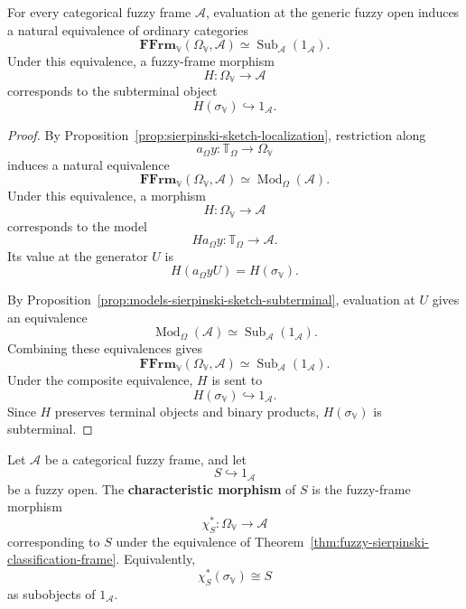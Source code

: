 \begin{theorem}
\label{thm:fuzzy-sierpinski-classification-frame}
For every categorical fuzzy frame \(\mathcal A\), evaluation at the generic fuzzy
open induces a natural equivalence of ordinary categories
\[
    \mathbf{FFrm}_{\mathbb V}(\Omega_{\mathbb V},\mathcal A)
    \simeq
    \operatorname{Sub}_{\mathcal A}(1_{\mathcal A}).
\]
Under this equivalence, a fuzzy-frame morphism
\[
    H:\Omega_{\mathbb V}\to\mathcal A
\]
corresponds to the subterminal object
\[
    H(\sigma_{\mathbb V})\hookrightarrow 1_{\mathcal A}.
\]
\end{theorem}

\begin{proof}
By Proposition~\ref{prop:sierpinski-sketch-localization}, restriction along
\[
    a_{\Omega}y:\mathbb T_{\Omega}\to\Omega_{\mathbb V}
\]
induces a natural equivalence
\[
    \mathbf{FFrm}_{\mathbb V}(\Omega_{\mathbb V},\mathcal A)
    \simeq
    \operatorname{Mod}_{\Omega}(\mathcal A).
\]
Under this equivalence, a morphism
\[
    H:\Omega_{\mathbb V}\to\mathcal A
\]
corresponds to the model
\[
    Ha_{\Omega}y:\mathbb T_{\Omega}\to\mathcal A.
\]
Its value at the generator \(U\) is
\[
    H(a_{\Omega}yU)
    =
    H(\sigma_{\mathbb V}).
\]

By Proposition~\ref{prop:models-sierpinski-sketch-subterminal}, evaluation at \(U\)
gives an equivalence
\[
    \operatorname{Mod}_{\Omega}(\mathcal A)
    \simeq
    \operatorname{Sub}_{\mathcal A}(1_{\mathcal A}).
\]
Combining these equivalences gives
\[
    \mathbf{FFrm}_{\mathbb V}(\Omega_{\mathbb V},\mathcal A)
    \simeq
    \operatorname{Sub}_{\mathcal A}(1_{\mathcal A}).
\]
Under the composite equivalence, \(H\) is sent to
\[
    H(\sigma_{\mathbb V})\hookrightarrow 1_{\mathcal A}.
\]
Since \(H\) preserves terminal objects and binary products,
\(H(\sigma_{\mathbb V})\) is subterminal.
\end{proof}

\begin{definition}
\label{def:characteristic-morphism-fuzzy-open}
Let \(\mathcal A\) be a categorical fuzzy frame, and let
\[
    S\hookrightarrow 1_{\mathcal A}
\]
be a fuzzy open. The \textbf{characteristic morphism} of \(S\) is the fuzzy-frame
morphism
\[
    \chi_S^\ast:
    \Omega_{\mathbb V}\to\mathcal A
\]
corresponding to \(S\) under the equivalence of
Theorem~\ref{thm:fuzzy-sierpinski-classification-frame}. Equivalently,
\[
    \chi_S^\ast(\sigma_{\mathbb V})
    \cong
    S
\]
as subobjects of \(1_{\mathcal A}\).
\end{definition}

